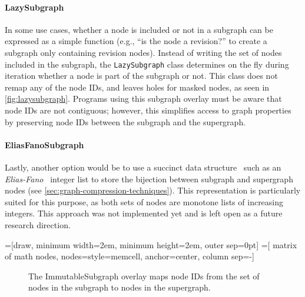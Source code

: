 \paragraph{LazySubgraph}
In some use cases, whether a node is included or not in a subgraph can be
expressed as a simple function (e.g., ``is the node a revision?'' to create a
subgraph only containing revision nodes). Instead of writing the set of nodes
included in the subgraph, the \texttt{LazySubgraph} class determines on the fly
during iteration whether a node is part of the subgraph or not. This class does
not remap any of the node IDs, and leaves holes for masked nodes, as seen in
\cref{fig:lazysubgraph}. Programs using this subgraph overlay must be aware
that node IDs are not contiguous; however, this simplifies access to graph
properties by preserving node IDs between the subgraph and the supergraph.

\paragraph{EliasFanoSubgraph}
Lastly, another option would be to use a succinct data structure~\cite{NavCDS}
such as an \emph{Elias-Fano}~\cite{EliESRCASF} integer list to store the
bijection between subgraph and supergraph nodes (see
\cref{sec:graph-compression-techniques}). This representation is particularly
suited for this purpose, as both sets of nodes are monotone lists of increasing
integers. This approach was not implemented yet and is left open as a future
research direction.

=[draw, minimum width=2em, minimum height=2em, outer sep=0pt]
=[
    matrix of math nodes,
    nodes={style=memcell, anchor=center},
    column sep=-\pgflinewidth]

\begin{figure}
    \centering
    \caption{The ImmutableSubgraph overlay maps node IDs from the set of nodes
    in the subgraph to nodes in the supergraph.}%
    \label{fig:immutablesubgraph}
\end{figure}

